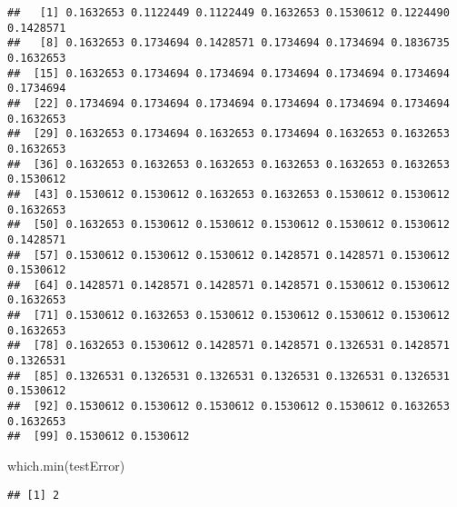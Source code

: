 \documentclass[
]{article}
\newenvironment{Shaded}{\begin{snugshade}}{\end{snugshade}}
\newcommand{\FunctionTok}[1]{\textcolor[rgb]{0.00,0.00,0.00}{#1}}
\newcommand{\NormalTok}[1]{#1}
\begin{document}
\begin{verbatim}
##   [1] 0.1632653 0.1122449 0.1122449 0.1632653 0.1530612 0.1224490 0.1428571
##   [8] 0.1632653 0.1734694 0.1428571 0.1734694 0.1734694 0.1836735 0.1632653
##  [15] 0.1632653 0.1734694 0.1734694 0.1734694 0.1734694 0.1734694 0.1734694
##  [22] 0.1734694 0.1734694 0.1734694 0.1734694 0.1734694 0.1734694 0.1632653
##  [29] 0.1632653 0.1734694 0.1632653 0.1734694 0.1632653 0.1632653 0.1632653
##  [36] 0.1632653 0.1632653 0.1632653 0.1632653 0.1632653 0.1632653 0.1530612
##  [43] 0.1530612 0.1530612 0.1632653 0.1632653 0.1530612 0.1530612 0.1632653
##  [50] 0.1632653 0.1530612 0.1530612 0.1530612 0.1530612 0.1530612 0.1428571
##  [57] 0.1530612 0.1530612 0.1530612 0.1428571 0.1428571 0.1530612 0.1530612
##  [64] 0.1428571 0.1428571 0.1428571 0.1428571 0.1530612 0.1530612 0.1632653
##  [71] 0.1530612 0.1632653 0.1530612 0.1530612 0.1530612 0.1530612 0.1632653
##  [78] 0.1632653 0.1530612 0.1428571 0.1428571 0.1326531 0.1428571 0.1326531
##  [85] 0.1326531 0.1326531 0.1326531 0.1326531 0.1326531 0.1326531 0.1530612
##  [92] 0.1530612 0.1530612 0.1530612 0.1530612 0.1530612 0.1632653 0.1632653
##  [99] 0.1530612 0.1530612
\end{verbatim}

\begin{Shaded}
\begin{Highlighting}[]
\FunctionTok{which.min}\NormalTok{(testError)}
\end{Highlighting}
\end{Shaded}

\begin{verbatim}
## [1] 2
\end{verbatim}
\end{document}
